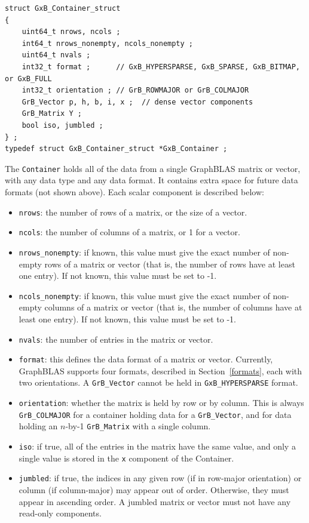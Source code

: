 \begin{mdframed}[userdefinedwidth=6in]
{\footnotesize
\begin{verbatim}
struct GxB_Container_struct
{
    uint64_t nrows, ncols ;
    int64_t nrows_nonempty, ncols_nonempty ;
    uint64_t nvals ;
    int32_t format ;      // GxB_HYPERSPARSE, GxB_SPARSE, GxB_BITMAP, or GxB_FULL
    int32_t orientation ; // GrB_ROWMAJOR or GrB_COLMAJOR
    GrB_Vector p, h, b, i, x ;  // dense vector components
    GrB_Matrix Y ;
    bool iso, jumbled ;
} ;
typedef struct GxB_Container_struct *GxB_Container ; \end{verbatim}
} \end{mdframed}

The \verb'Container' holds all of the data from a single GraphBLAS matrix or
vector, with any data type and any data format.  It contains extra space for
future data formats (not shown above).  Each scalar component is described
below:

\begin{itemize}
\item \verb'nrows': the number of rows of a matrix, or the size of a vector.
\item \verb'ncols': the number of columns of a matrix, or 1 for a vector.
\item \verb'nrows_nonempty':  if known, this value must give the exact number
    of non-empty rows of a matrix or vector (that is, the number of
    rows have at least one entry).  If not known, this value must be
    set to -1.
\item \verb'ncols_nonempty':  if known, this value must give the exact number
    of non-empty columns of a matrix or vector (that is, the number of
    columns have at least one entry).  If not known, this value must be
    set to -1.
\item \verb'nvals': the number of entries in the matrix or vector.
\item \verb'format': this defines the data format of a matrix or vector.
    Currently, GraphBLAS supports four formats, described in
    Section~\ref{formats}, each with two orientations.  A \verb'GrB_Vector'
    cannot be held in \verb'GxB_HYPERSPARSE' format.
\item \verb'orientation':  whether the matrix is held by row or by column.
    This is always \verb'GrB_COLMAJOR' for a container holding data for a
    \verb'GrB_Vector', and for data holding an $n$-by-1 \verb'GrB_Matrix'
    with a single column.
\item \verb'iso': if true, all of the entries in the matrix have the same
    value, and only a single value is stored in the \verb'x' component of
    the Container.
\item \verb'jumbled': if true, the indices in any given row (if in row-major
    orientation) or column (if column-major) may appear out of order.
    Otherwise, they must appear in ascending order.
    A jumbled matrix or vector must not have any read-only components.
\end{itemize}

